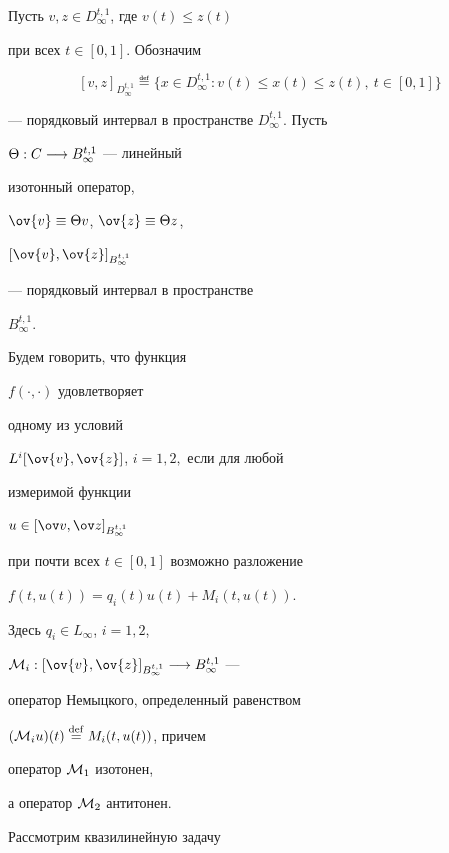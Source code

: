 Пусть $v,z \in { D}^{t,1}_{\infty}$, где $v(t)\le z(t)$


при всех $t \in [0,1]$. Обозначим


$$


[v,z]_{D^{t,1}_{\infty}}\eqdef \{ x\in


D^{t,1}_{\infty}: v(t)\le x(t)\le z(t),\ t \in [0,1]\}


$$


--- порядковый интервал в пространстве ${ D}^{t,1}_{\infty}$. Пусть


$\Theta: { C}\longrightarrow { B}_{\infty}^{t,1}$ --- линейный


изотонный оператор,


$\ov{v}\equiv \Theta v$, $\ov{z}\equiv \Theta z$,


$[\ov{v},\ov{z}]_{B^{t,1}_{\infty}}$


--- порядковый интервал в пространстве


${ B}^{t,1}_{\infty}$.





\begin{defn}


Будем говорить, что функция


$f(\cdot,\cdot)$ удовлетворяет


одному из условий


$L^i[\ov{v},\ov{z}]$, $i=1,2,$ если для любой


измеримой функции


$u\in [\ov v,\ov z]_{B^{t,1}_{\infty}}$


при почти всех $t \in [0,1]$ возможно разложение


$f(t,u(t))=q_i(t)u(t)+M_i(t,u(t))$.


Здесь $q_i\in{ L}_\infty$, $i=1,2$,


${\cal M}_i:[\ov{v},\ov{z}]_{B^{t,1}_{\infty}}\seta


{ B}^{t,1}_{\infty}$ ---


оператор Немыцкого, определенный равенством


$({\cal M}_iu)(t)\overset{\mathrm{def}}{=}{} M_i(t,u(t))$, причем


оператор ${\cal M}_1$ изотонен,


а оператор ${\cal M}_2$ антитонен.


\end{defn}





Рассмотрим квазилинейную задачу


